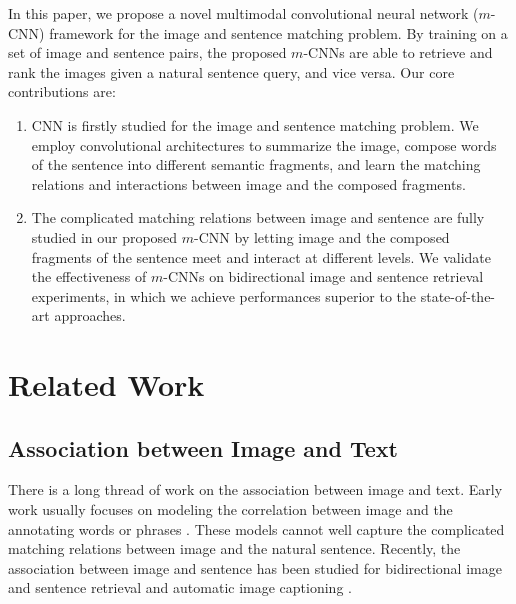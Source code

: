 \documentclass[10pt,twocolumn,letterpaper]{article}
\begin{document}
In this paper, we propose a novel multimodal convolutional neural network ($m$-CNN) framework for the image and sentence matching problem. By training on a set of image and sentence pairs, the proposed $m$-CNNs are able to retrieve and rank the images given a natural sentence query, and vice versa. Our core contributions are:
\begin{enumerate}
  \item CNN is firstly studied for the image and sentence matching problem. We employ convolutional architectures to summarize the image, compose words of the sentence into different semantic fragments, and learn the matching relations and interactions between image and the composed fragments.
\item The complicated matching relations between image and sentence are fully studied in our proposed $m$-CNN by letting image and the composed fragments of the sentence meet and interact at different levels. We validate the effectiveness of $m$-CNNs on bidirectional image and sentence retrieval experiments, in which we achieve performances superior to the state-of-the-art approaches.
\end{enumerate}












\section{Related Work}
\label{sec_related}
\subsection{Association between Image and Text}
There is a long thread of work on the association between image and text. Early work usually focuses on modeling the correlation between image and the annotating words \cite{frome_nips2013, nitish_icml2012, nitish_nips2012,grangier_icann2006, weston_ijcai2011} or phrases \cite{sadeghi_cvpr2011, zitnick_iccv2013}. These models cannot well capture the complicated matching relations between image and the natural sentence. Recently, the association between image and sentence has been studied for bidirectional image and sentence retrieval \cite{hodosh_jair2013, karpathy_2014, socher_tacl2014, yan_cvpr2015, klein_cvpr2015, kiros_2015, plummer_2015} and automatic image captioning \cite{chen_2014,donahue_2014,karpathy_dvsa_2014,kiros_icml2014,kiros_2014,mao_2014,mao_iclr_2015,vinyals_2014}.
\end{document}
